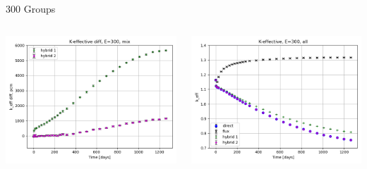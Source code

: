 \documentclass[
	11pt, %
	aspectratio=169, %
]{beamer}
\begin{document}
\begin{frame}{300 Groups}
\begin{columns}[c]
\begin{column}{0.32\textwidth}
			\includegraphics[width=\textwidth]{../figures/keff/keff_mix_300_diff.png}
		\end{column}
		\begin{column}{0.32\textwidth} %
			\includegraphics[width=\textwidth]{../figures/keff/keff_all_300.png}


\end{column}
\end{columns}
\end{frame}
\end{document}
